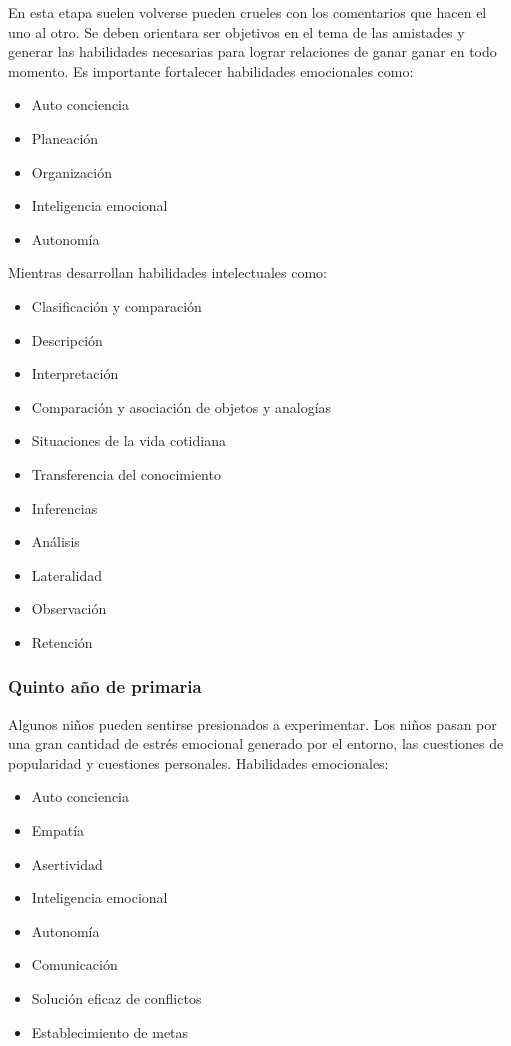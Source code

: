 \documentclass[letterpaper,10pt]{article}
\begin{document}
 En esta etapa suelen volverse pueden crueles con los comentarios que hacen el uno 
 al otro. Se deben orientara ser objetivos en el tema de las amistades
 y generar las habilidades necesarias para lograr relaciones de ganar ganar en 
 todo momento.
Es importante fortalecer habilidades emocionales como:
\begin{itemize}
	\item Auto conciencia
	\item Planeación
	\item Organización
	\item Inteligencia emocional
	\item Autonomía
\end{itemize}
Mientras desarrollan habilidades intelectuales como:
\begin{itemize}
	\item Clasificación y comparación
	\item Descripción
	\item Interpretación
	\item Comparación y asociación de objetos y analogías
	\item Situaciones de la vida cotidiana
	\item Transferencia del conocimiento
	\item Inferencias
	\item Análisis
	\item Lateralidad
	\item Observación
	\item Retención

\end{itemize}

\subsubsection{Quinto año de primaria}

Algunos niños pueden sentirse presionados a experimentar. 
Los niños pasan por una gran cantidad de estrés emocional generado por el entorno, 
las cuestiones de popularidad y cuestiones personales. 
Habilidades emocionales:

\begin{itemize}
	\item Auto conciencia
	\item Empatía
	\item Asertividad
	\item Inteligencia emocional
	\item Autonomía
	\item Comunicación
	\item Solución eficaz de conflictos
	\item Establecimiento de metas
\end{itemize}
\end{document}
